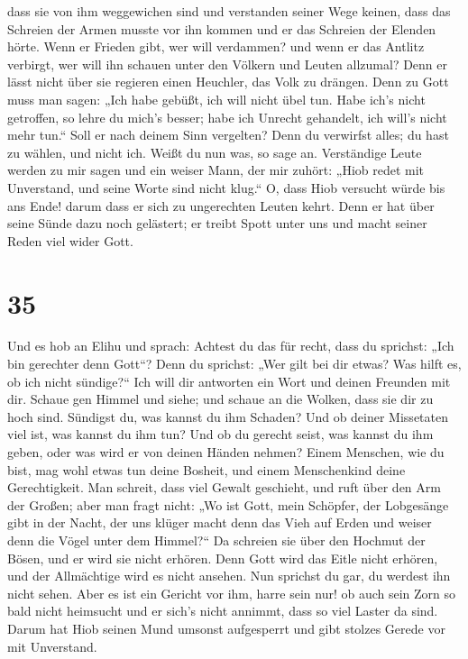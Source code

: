 dass sie von ihm weggewichen sind und verstanden seiner Wege keinen,
 dass das Schreien der Armen musste vor ihn kommen und er
das Schreien der Elenden hörte.  Wenn er Frieden gibt,
wer will verdammen? und wenn er das Antlitz verbirgt, wer will ihn
schauen unter den Völkern und Leuten allzumal?  Denn er
lässt nicht über sie regieren einen Heuchler, das Volk zu drängen.
 Denn zu Gott muss man sagen: „Ich habe gebüßt, ich will
nicht übel tun.  Habe ich's nicht getroffen, so lehre du
mich's besser; habe ich Unrecht gehandelt, ich will's nicht mehr tun.``
 Soll er nach deinem Sinn vergelten? Denn du verwirfst
alles; du hast zu wählen, und nicht ich. Weißt du nun was, so sage an.
 Verständige Leute werden zu mir sagen und ein weiser
Mann, der mir zuhört:  „Hiob redet mit Unverstand, und
seine Worte sind nicht klug.``  O, dass Hiob versucht
würde bis ans Ende! darum dass er sich zu ungerechten Leuten kehrt.
 Denn er hat über seine Sünde dazu noch gelästert; er
treibt Spott unter uns und macht seiner Reden viel wider Gott.

\hypertarget{section-34}{%
\section{35}\label{section-34}}

 Und es hob an Elihu und sprach:  Achtest du
das für recht, dass du sprichst: „Ich bin gerechter denn Gott``?
 Denn du sprichst: „Wer gilt bei dir etwas? Was hilft es,
ob ich nicht sündige?{}``  Ich will dir antworten ein Wort
und deinen Freunden mit dir.  Schaue gen Himmel und siehe;
und schaue an die Wolken, dass sie dir zu hoch sind. 
Sündigst du, was kannst du ihm Schaden? Und ob deiner Missetaten viel
ist, was kannst du ihm tun?  Und ob du gerecht seist, was
kannst du ihm geben, oder was wird er von deinen Händen nehmen?
 Einem Menschen, wie du bist, mag wohl etwas tun deine
Bosheit, und einem Menschenkind deine Gerechtigkeit.  Man
schreit, dass viel Gewalt geschieht, und ruft über den Arm der Großen;
 aber man fragt nicht: „Wo ist Gott, mein Schöpfer, der
Lobgesänge gibt in der Nacht,  der uns klüger macht denn
das Vieh auf Erden und weiser denn die Vögel unter dem Himmel?{}``
 Da schreien sie über den Hochmut der Bösen, und er wird
sie nicht erhören.  Denn Gott wird das Eitle nicht
erhören, und der Allmächtige wird es nicht ansehen.  Nun
sprichst du gar, du werdest ihn nicht sehen. Aber es ist ein Gericht vor
ihm, harre sein nur!  ob auch sein Zorn so bald nicht
heimsucht und er sich's nicht annimmt, dass so viel Laster da sind.
 Darum hat Hiob seinen Mund umsonst aufgesperrt und gibt
stolzes Gerede vor mit Unverstand.

